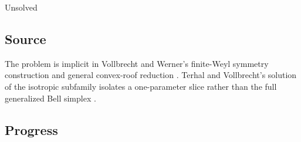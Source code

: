 Unsolved

\subsection*{Source}

The problem is implicit in Vollbrecht and Werner's finite-Weyl symmetry
construction and general convex-roof reduction
.  Terhal and Vollbrecht's
solution of the isotropic subfamily isolates a one-parameter slice rather
than the full generalized Bell simplex
.

\subsection*{Progress}

